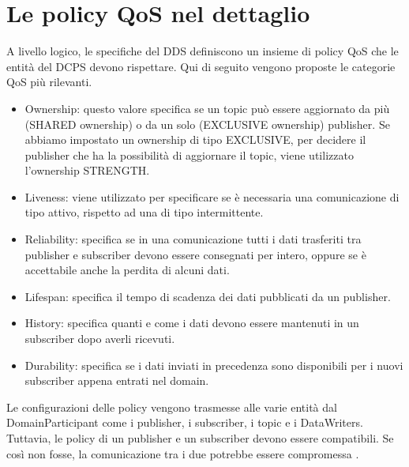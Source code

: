 \section{Le policy QoS nel dettaglio}
A livello logico, le specifiche del DDS
definiscono un insieme di policy QoS
che le entità del DCPS devono rispettare. Qui di seguito vengono
proposte le categorie QoS più rilevanti.
\begin{itemize}
    \item Ownership: questo valore specifica se un topic
    può essere aggiornato da più 
    (SHARED ownership) o da un solo (EXCLUSIVE ownership) publisher.
    Se abbiamo impostato un ownership di tipo EXCLUSIVE, per decidere il 
    publisher che ha la possibilità di aggiornare il topic, viene 
    utilizzato l'ownership STRENGTH.
    \item Liveness: viene utilizzato per specificare se è necessaria
    una comunicazione di tipo attivo, rispetto ad una di tipo 
    intermittente.
    \item Reliability: specifica se in una comunicazione tutti i dati
    trasferiti tra publisher e subscriber devono essere consegnati
    per intero, oppure
    se è accettabile anche la perdita di alcuni dati.
    \item Lifespan: specifica il tempo di scadenza dei dati pubblicati da 
    un publisher.
    \item History: specifica quanti e come i dati devono essere 
    mantenuti in un 
    subscriber dopo averli ricevuti.
    \item Durability: specifica se i dati inviati in precedenza sono
    disponibili per i nuovi subscriber appena entrati nel domain.
\end{itemize}
Le configurazioni 
delle policy vengono trasmesse alle varie entità dal DomainParticipant
come i publisher, i subscriber, i topic e i DataWriters.
Tuttavia, le policy di un publisher e un subscriber devono essere compatibili.
Se così non fosse, la comunicazione tra i due potrebbe essere compromessa
\cite{Michaud2017Apr}.
\label{Le policy QoS nel dettaglio}


